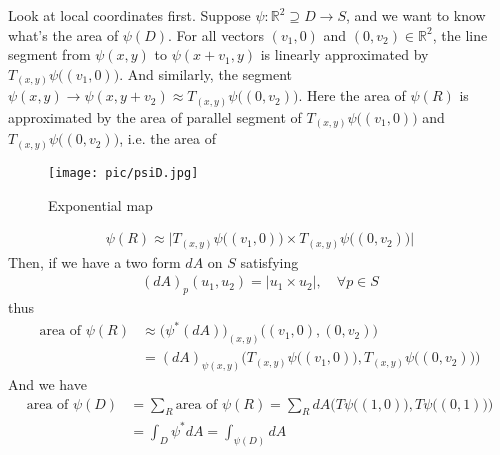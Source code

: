 \documentclass[10pt]{article}
\begin{document}
            Look at local coordinates first. Suppose $\psi:\mathbb{R}^2 \supseteq D\longrightarrow S$, and we want to know what's the area of $\psi(D)$. For all vectors $(v_1, 0)$ and $(0, v_2)\in\mathbb{R}^2$, the line segment from $\psi(x, y)$ to $\psi(x+v_1, y)$ is linearly approximated by $T_{(x,y)}\psi\big((v_1, 0)\big)$. And similarly, the segment $\psi(x, y)\longrightarrow\psi(x,y+v_2)\approx T_{(x, y)}\psi\big((0, v_2)\big)$. Here the area of $\psi(R)$ is approximated by the area of parallel segment of $T_{(x,y)}\psi\big((v_1, 0)\big)$ and $T_{(x,y)}\psi\big((0, v_2)\big)$, i.e. the area of
            \begin{marginfigure}
                \vspace{-2cm}
                \begin{figure}[H]
                    \centering
                    \texttt{[image: pic/psiD.jpg]}
                    \caption{Exponential map}
                \end{figure}
		\end{marginfigure}
            \begin{equation*}
                \begin{aligned}
                    \psi(R) \approx \bigg|T_{(x,y)}\psi\big((v_1, 0)\big) \times T_{(x,y)}\psi\big((0, v_2)\big)\bigg|
                \end{aligned}
            \end{equation*}
            Then, if we have a two form $dA$ on $S$ satisfying
            \begin{equation*}
                \begin{aligned}
                    (dA)_p(u_1, u_2) = \big|u_1\times u_2\big|,\quad\forall p\in S
                \end{aligned}
            \end{equation*}
            thus
            \begin{equation*}
                \begin{aligned}
                    \text{area of }\psi(R) &\approx \big(\psi^*(dA)\big)_{(x,y)}\big((v_1,0), (0,v_2)\big) \\
                    &= (dA)_{\psi(x, y)}\bigg(T_{(x,y)}\psi\big((v_1, 0)\big), T_{(x,y)}\psi\big((0, v_2)\big)\bigg)
                \end{aligned}
            \end{equation*}
            And we have
            \begin{equation*}
                \begin{aligned}
                    \text{area of }\psi(D) &= \sum_R\text{area of }\psi(R) = \sum_RdA\bigg(T\psi\big((1,0)\big), T\psi\big((0,1)\big)\bigg) \\
                    &= \int_D\psi^*dA = \int_{\psi(D)}dA
                \end{aligned}
            \end{equation*}
\end{document}
